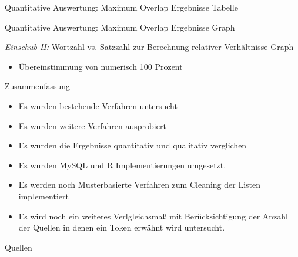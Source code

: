 \documentclass{beamer}
\begin{document}
\begin{frame}{Quantitative Auswertung: Maximum Overlap Ergebnisse}
	Tabelle
\end{frame}

\begin{frame}{Quantitative Auswertung: Maximum Overlap Ergebnisse}
	Graph
\end{frame}

\begin{frame}{\emph{Einschub II: }Wortzahl vs. Satzzahl zur Berechnung relativer Verh\"altnisse}
	Graph
	\begin{itemize}
		\item{\"Ubereinstimmung von numerisch 100 Prozent}
	\end{itemize}
\end{frame}



\begin{frame}{Zusammenfassung}
	\begin{itemize}
		\item{Es wurden bestehende Verfahren untersucht}
		\item{Es wurden weitere Verfahren ausprobiert}
		\item{Es wurden die Ergebnisse quantitativ und qualitativ verglichen}
		\item{Es wurden MySQL und R Implementierungen umgesetzt.}
		\item{Es werden noch Musterbasierte Verfahren zum Cleaning der Listen implementiert}
		\item{Es wird noch ein weiteres Verlgleichsmaß mit Ber\"ucksichtigung der Anzahl der Quellen in denen ein Token erw\"ahnt wird untersucht.}
	\end{itemize}
\end{frame}



\begin{frame}[allowframebreaks]{Quellen}
	\nocite{*}
	
    
\end{frame}
\end{document}
